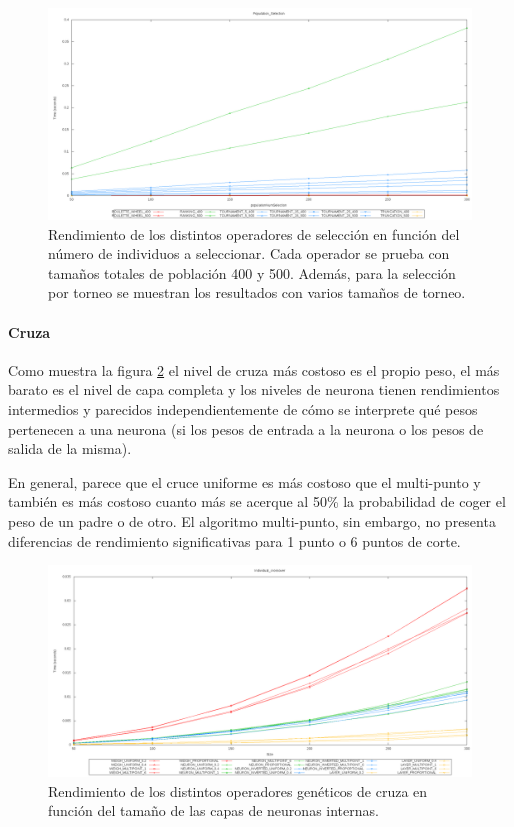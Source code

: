 \documentclass[11pt]{article}
\begin{document}
\begin{titlepage}
\begin{figure}[htb]
\centering
\includegraphics[width=\textwidth]{./img/Population_Selection.png}
\caption{\label{rendGenSelect}Rendimiento de los distintos operadores de selección en función del número de individuos a seleccionar. Cada operador se prueba con tamaños totales de población 400 y 500. Además, para la selección por torneo se muestran los resultados con varios tamaños de torneo.}
\end{figure}
\newpage
\paragraph{Cruza}
\label{sec-6-1-2-2}


Como muestra la figura \ref{rendGenCruza} el nivel de cruza más costoso es el propio peso, el más barato es el nivel de capa completa y los niveles de neurona tienen rendimientos intermedios y parecidos independientemente de cómo se interprete qué pesos pertenecen a una neurona (si los pesos de entrada a la neurona o los pesos de salida de la misma).

En general, parece que el cruce uniforme es más costoso que el multi-punto y también es más costoso cuanto más se acerque al 50\% la probabilidad de coger el peso de un padre o de otro. El algoritmo multi-punto, sin embargo, no presenta diferencias de rendimiento significativas para 1 punto o 6 puntos de corte.

\begin{figure}[htb]
\centering
\includegraphics[width=\textwidth]{./img/Individual_crossover.png}
\caption{\label{rendGenCruza}Rendimiento de los distintos operadores genéticos de cruza en función del tamaño de las capas de neuronas internas.}
\end{figure}
\newpage

\end{titlepage}
\end{document}
